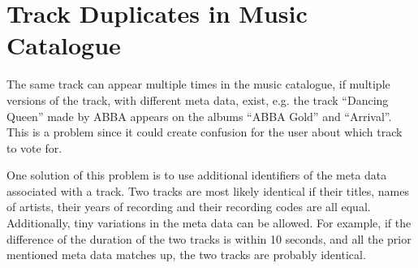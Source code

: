 \section{Track Duplicates in Music Catalogue}
\label{sec:duplicates}
The same track can appear multiple times in the music catalogue, if multiple versions of the track, with different meta data, exist, e.g. the track \enquote{Dancing Queen} made by ABBA appears on the albums \enquote{ABBA Gold} and \enquote{Arrival}. This is a problem since it could create confusion for the user about which track to vote for.

One solution of this problem is to use additional identifiers of the
meta data associated with a track. Two tracks are most likely
identical if their titles, names of artists, their years of recording and
their recording codes are all equal. Additionally, tiny variations in
the meta data can be allowed. For example, if the difference of the duration of the
two tracks is within 10 seconds, and all the prior mentioned meta data
matches up, the two tracks are probably identical.

